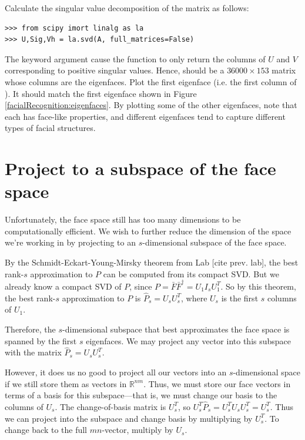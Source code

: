 \begin{problem}
\label{prob:svd}
Calculate the singular value decomposition of the matrix  as follows:
\begin{lstlisting}
>>> from scipy imort linalg as la
>>> U,Sig,Vh = la.svd(A, full_matrices=False)
\end{lstlisting}
The keyword argument  cause the function to only return the columns of $U$ and $V$ corresponding
to positive singular values. Hence,  should be a $36000\times 153$ matrix whose columns are the eigenfaces.
Plot the first eigenface (i.e. the first column of ).
It should match the first eigenface shown in Figure \ref{facialRecognition:eigenfaces}.
By plotting some of the other eigenfaces, note that each has face-like properties, and different eigenfaces tend to capture different
types of facial structures.
\end{problem}

\section*{Project to a subspace of the face space}
Unfortunately, the face space still has too many dimensions to be computationally efficient.
We wish to further reduce the dimension of the space we're working in by projecting to an $s$-dimensional subspace of the face space.

By the Schmidt-Eckart-Young-Mirsky theorem from Lab [cite prev. lab], the best rank-$s$ approximation to $P$ can be computed from its compact SVD.
But we already know a compact SVD of $P$, since $P = \bar{F}\bar{F}^{\dagger} = U_1 I_s U_1^T$. So by this theorem, the best rank-$s$ approximation to $P$ is $\widehat{P}_s = U_sU_s^T$, where $U_s$ is the first $s$ columns of $U_1$.

Therefore, the $s$-dimensional subspace that best approximates the face space is spanned by the first $s$ eigenfaces. 
We may project any vector into this subspace with the matrix $\widehat{P}_s = U_sU_s^T$.

However, it does us no good to project all our vectors into an $s$-dimensional space if we still store them as vectors in $\mathbb{R}^{nm}$. 
Thus, we must store our face vectors in terms of a basis for this subspace---that is, we must change our basis to the columns of $U_s$.
The change-of-basis matrix is $U_s^T$, so $U_s^T\widehat{P}_s = U_s^TU_sU_s^T = U_s^T$. 
Thus we can project into the subspace and change basis by multiplying by $U_s^T$.
To change back to the full $mn$-vector, multiply by $U_s$.

